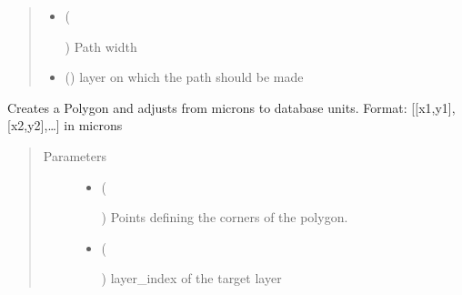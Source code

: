 \documentclass[a4paper,10pt,english]{sphinxmanual}
\begin{document}
\begin{fulllineitems}
\begin{fulllineitems}
\begin{quote}
\begin{description}
\begin{itemize}
\item {} 
 (%
\begin{footnote}[47]\sphinxAtStartFootnote
{}
%
\end{footnote}) \textendash{} Path width

\item {} 
 () \textendash{} layer on which the path should be made

\end{itemize}

\end{description}\end{quote}

\end{fulllineitems}


\begin{fulllineitems}
\label{\detokenize{photonics:kppc.photonics.PhotDevice.create_polygon}}
Creates a Polygon and adjusts from microns to database units. Format: {[}{[}x1,y1{]},{[}x2,y2{]},…{]} in microns
\begin{quote}\begin{description}
\item[{Parameters}] \leavevmode\begin{itemize}
\item {} 
 (%
\begin{footnote}[48]\sphinxAtStartFootnote
{}
%
\end{footnote}) \textendash{} Points defining the corners of the polygon.

\item {} 
 (%
\begin{footnote}[49]\sphinxAtStartFootnote
{}
%
\end{footnote}) \textendash{} layer\_index of the target layer


\end{itemize}
\end{description}
\end{quote}
\end{fulllineitems}
\end{fulllineitems}
\end{document}
